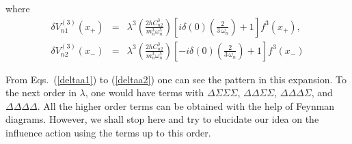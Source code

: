 \documentclass[%
amssymb,preprint,preprintnumbers,nofootinbib,superscriptaddress]{revtex4}
\begin{document}
where 
\begin{eqnarray}
    \delta V_{n1}^{(3)}(x_{+})&=&\lambda^{3}\left(\frac{2\hbar C_{n2}^{3}}{m_{n}^{3}\omega_{n}^{5}}\right)\left[i\delta(0)\left(\frac{2}{3\,\omega_{n}}\right)+1\right]f^{3}(x_{+}),\\
    \delta V_{n2}^{(3)}(x_{-})&=&\lambda^{3}\left(\frac{2\hbar C_{n2}^{3}}{m_{n}^{3}\omega_{n}^{5}}\right)\left[-i\delta(0)\left(\frac{2}{3\,\omega_{n}}\right)+1\right]f^{3}(x_{-})
\end{eqnarray}

From Eqs.~(\ref{deltaa1}) to (\ref{deltaa2}) one can see the pattern in this expansion. To the next order in $\lambda$, one would have terms with $\Delta\Sigma\Sigma\Sigma$, $\Delta\Delta\Sigma\Sigma$, $\Delta\Delta\Delta\Sigma$, and $\Delta\Delta\Delta\Delta$. All the higher order terms can be obtained with the help of Feynman diagrams. However, we shall stop here and try to elucidate our idea on the influence action using the terms up to this order.
\end{document}
